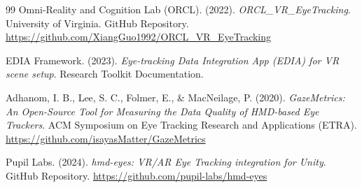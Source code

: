 \documentclass[12pt,a4paper]{article}
\begin{document}
\begin{thebibliography}{99}
    Omni-Reality and Cognition Lab (ORCL). (2022).
    \textit{ORCL\_VR\_EyeTracking}.
    University of Virginia. GitHub Repository. \url{https://github.com/XiangGuo1992/ORCL_VR_EyeTracking}

    EDIA Framework. (2023).
    \textit{Eye-tracking Data Integration App (EDIA) for VR scene setup}.
    Research Toolkit Documentation.

    Adhanom, I. B., Lee, S. C., Folmer, E., \& MacNeilage, P. (2020).
    \textit{GazeMetrics: An Open-Source Tool for Measuring the Data Quality of HMD-based Eye Trackers}.
    ACM Symposium on Eye Tracking Research and Applications (ETRA). \url{https://github.com/isayasMatter/GazeMetrics}

    Pupil Labs. (2024).
    \textit{hmd-eyes: VR/AR Eye Tracking integration for Unity}.
    GitHub Repository. \url{https://github.com/pupil-labs/hmd-eyes}

\end{thebibliography}
\end{document}
